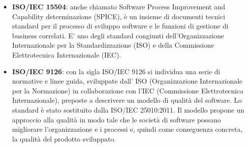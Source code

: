 \begin{itemize}
	\item
	\textbf{ISO/IEC 15504}: anche chiamato Software Process Improvement and Capability determinazione (SPICE), è un insieme di documenti tecnici standard per il processo di sviluppo software e le funzioni di gestione di business correlati. E' uno degli standard congiunti dell'Organizzazione Internazionale per la Standardizzazione (ISO) e della Commissione Elettrotecnica Internazionale (IEC).
	\item
	\textbf{ISO/IEC 9126}: con la sigla ISO/IEC 9126 si individua una serie di normative e linee guida, sviluppate dall’ ISO (Organizzazione Internazionale per la Normazione) in collaborazione con l'IEC (Commissione Elettrotecnica Internazionale), preposte a descrivere un modello di qualità del software. Lo standard è stato sostituito dalla ISO/IEC 25010:2011. Il modello propone un approccio alla qualità in modo tale che le società di software possano migliorare l'organizzazione e i processi e, quindi come conseguenza concreta, la qualità del prodotto sviluppato.
\end{itemize}